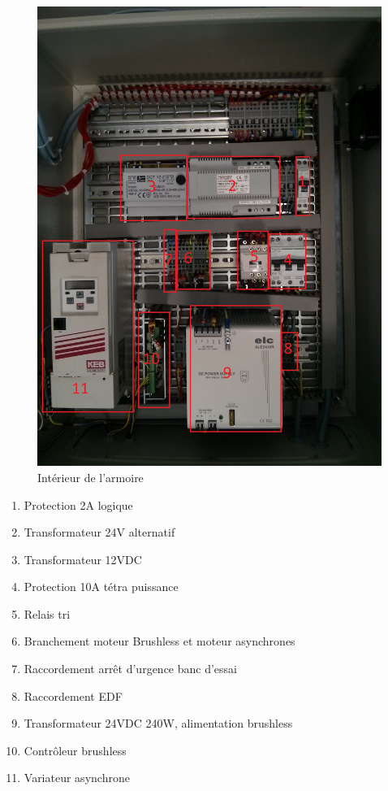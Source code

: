\documentclass[11pt]{article}
\begin{document}
\begin{figure}[!h]
    \centering
    \includegraphics[width=450px]{IMG_20160629_193634.jpg}
    \caption{Intérieur de l'armoire}
\end{figure}
\FloatBarrier
\begin{enumerate}
	\item Protection 2A logique
	\item Transformateur 24V alternatif
	\item Transformateur 12VDC
	\item Protection 10A tétra puissance
	\item Relais tri
	\item Branchement moteur Brushless et moteur asynchrones
	\item Raccordement arrêt d'urgence banc d'essai
	\item Raccordement EDF
	\item Transformateur 24VDC 240W, alimentation brushless
	\item Contrôleur brushless
	\item Variateur asynchrone
\end{enumerate}
\end{document}
